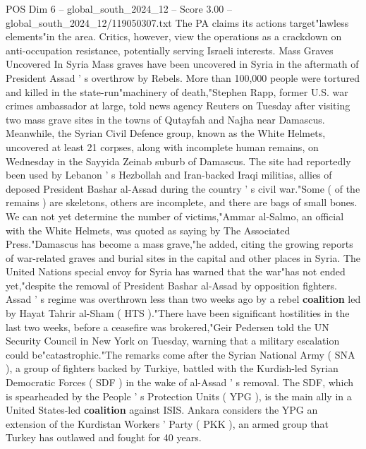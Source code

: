 \begin{textsample}{POS Dim 6 – global\_south\_2024\_12 – Score 3.00 – global\_south\_2024\_12/119050307.txt}
The PA claims its actions target"lawless elements"in the area.
Critics, however, view the operations as a crackdown on anti-occupation resistance, potentially serving Israeli interests.
Mass Graves Uncovered In Syria Mass graves have been uncovered in Syria in the aftermath of President Assad ' s overthrow by Rebels.
More than 100,000 people were tortured and killed in the state-run"machinery of death,"Stephen Rapp, former U.S. war crimes ambassador at large, told news agency Reuters on Tuesday after visiting two mass grave sites in the towns of Qutayfah and Najha near Damascus.
Meanwhile, the Syrian Civil Defence group, known as the White Helmets, uncovered at least 21 corpses, along with incomplete human remains, on Wednesday in the Sayyida Zeinab suburb of Damascus.
The site had reportedly been used by Lebanon ' s Hezbollah and Iran-backed Iraqi militias, allies of deposed President Bashar al-Assad during the country ' s civil war."Some ( of the remains ) are skeletons, others are incomplete, and there are bags of small bones.
We can not yet determine the number of victims,"Ammar al-Salmo, an official with the White Helmets, was quoted as saying by The Associated Press."Damascus has become a mass grave,"he added, citing the growing reports of war-related graves and burial sites in the capital and other places in Syria.
The United Nations special envoy for Syria has warned that the war"has not ended yet,"despite the removal of President Bashar al-Assad by opposition fighters.
Assad ' s regime was overthrown less than two weeks ago by a rebel \textbf{coalition} led by Hayat Tahrir al-Sham ( HTS )."There have been significant hostilities in the last two weeks, before a ceasefire was brokered,"Geir Pedersen told the UN Security Council in New York on Tuesday, warning that a military escalation could be"catastrophic."The remarks come after the Syrian National Army ( SNA ), a group of fighters backed by Turkiye, battled with the Kurdish-led Syrian Democratic Forces ( SDF ) in the wake of al-Assad ' s removal.
The SDF, which is spearheaded by the People ' s Protection Units ( YPG ), is the main ally in a United States-led \textbf{coalition} against ISIS.
Ankara considers the YPG an extension of the Kurdistan Workers ' Party ( PKK ), an armed group that Turkey has outlawed and fought for 40 years.

\end{textsample}
